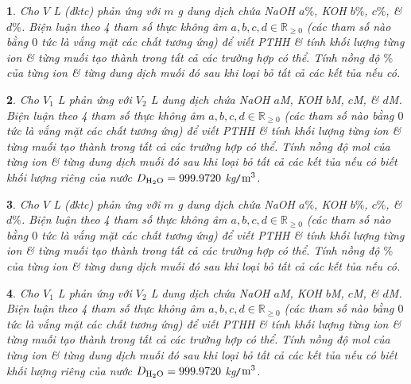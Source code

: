 \documentclass{article}
\newtheorem{baitoan}{}
\begin{document}
\begin{baitoan}
	Cho $V$ {\rm L } (đktc) phản ứng với $m$ {\rm g} dung dịch chứa {\rm NaOH $a\%$, KOH $b\%$,  $c\%$, \&  $d\%$}. Biện luận theo 4 tham số thực không âm $a,b,c,d\in\mathbb{R}_{\ge0}$ (các tham số nào bằng $0$ tức là vắng mặt các chất tương ứng) để viết {\rm PTHH} \& tính khối lượng từng ion \& từng muối tạo thành trong tất cả các trường hợp có thể. Tính nồng độ $\%$ của từng ion \& từng dung dịch muối đó sau khi loại bỏ tất cả các kết tủa nếu có.
\end{baitoan}

\begin{baitoan}
	Cho $V_1$ {\rm L } phản ứng với $V_2$ {\rm L} dung dịch chứa {\rm NaOH $a$M, KOH $b$M,  $c$M, \&  $d$M}. Biện luận theo 4 tham số thực không âm $a,b,c,d\in\mathbb{R}_{\ge0}$ (các tham số nào bằng $0$ tức là vắng mặt các chất tương ứng) để viết {\rm PTHH} \& tính khối lượng từng ion \& từng muối tạo thành trong tất cả các trường hợp có thể. Tính nồng độ mol của từng ion \& từng dung dịch muối đó sau khi loại bỏ tất cả các kết tủa nếu có biết khối lượng riêng của nước $D_{\ce{H2O}} = 999.9720$ {\rm kg{\tt/}$\rm m^3$}.
\end{baitoan}

\begin{baitoan}
	Cho $V$ {\rm L } (đktc) phản ứng với $m$ {\rm g} dung dịch chứa {\rm NaOH $a\%$, KOH $b\%$,  $c\%$, \&  $d\%$}. Biện luận theo 4 tham số thực không âm $a,b,c,d\in\mathbb{R}_{\ge0}$ (các tham số nào bằng $0$ tức là vắng mặt các chất tương ứng) để viết {\rm PTHH} \& tính khối lượng từng ion \& từng muối tạo thành trong tất cả các trường hợp có thể. Tính nồng độ $\%$ của từng ion \& từng dung dịch muối đó sau khi loại bỏ tất cả các kết tủa nếu có.
\end{baitoan}

\begin{baitoan}
	Cho $V_1$ {\rm L } phản ứng với $V_2$ {\rm L} dung dịch chứa {\rm NaOH $a$M, KOH $b$M,  $c$M, \&  $d$M}. Biện luận theo 4 tham số thực không âm $a,b,c,d\in\mathbb{R}_{\ge0}$ (các tham số nào bằng $0$ tức là vắng mặt các chất tương ứng) để viết {\rm PTHH} \& tính khối lượng từng ion \& từng muối tạo thành trong tất cả các trường hợp có thể. Tính nồng độ mol của từng ion \& từng dung dịch muối đó sau khi loại bỏ tất cả các kết tủa nếu có biết khối lượng riêng của nước $D_{\ce{H2O}} = 999.9720$ {\rm kg{\tt/}$\rm m^3$}.
\end{baitoan}
\end{document}
